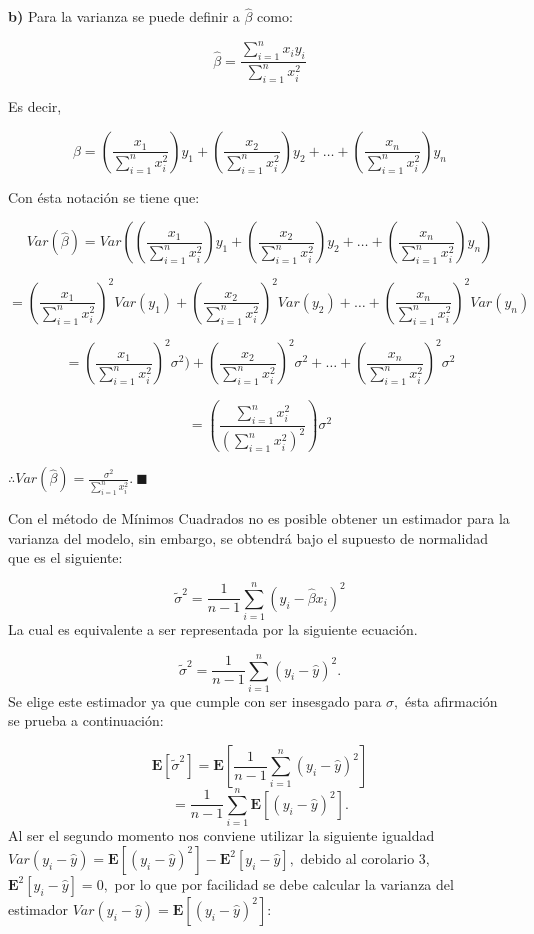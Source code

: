 \documentclass[
  a4paper,
  oneside,
  openany]{book}
\begin{document}
\textbf{b)} Para la varianza se puede definir a \(\hat{\beta}\) como:

\[\hat{\beta}=\frac{\sum_{i=1}^{n}x_{i}y_{i}}{\sum_{i=1}^{n}x_{i}^2}\]

Es decir,

\[\hat{\beta}=\left(\frac{x_{1}}{\sum_{i=1}^{n}x_{i}^2}\right)y_{1} + \left(\frac{x_{2}}{\sum_{i=1}^{n}x_{i}^2}\right)y_{2} + \ldots + \left(\frac{x_{n}}{\sum_{i=1}^{n}x_{i}^2}\right)y_{n}\]

Con ésta notación se tiene que:

\[Var\left(\hat{\beta}\right)=Var\left( \left(\frac{x_{1}}{\sum_{i=1}^{n}x_{i}^2}\right)y_{1} + \left(\frac{x_{2}}{\sum_{i=1}^{n}x_{i}^2}\right)y_{2} + \ldots + \left(\frac{x_{n}}{\sum_{i=1}^{n}x_{i}^2}\right)y_{n} \right)\]

\[=\left(\frac{x_{1}}{\sum_{i=1}^{n}x_{i}^2}\right)^2Var(y_{1}) + \left(\frac{x_{2}}{\sum_{i=1}^{n}x_{i}^2}\right)^2Var(y_{2}) + \ldots + \left(\frac{x_{n}}{\sum_{i=1}^{n}x_{i}^2}\right)^2Var(y_{n})\]

\[=\left(\frac{x_{1}}{\sum_{i=1}^{n}x_{i}^2}\right)^2\sigma^2) + \left(\frac{x_{2}}{\sum_{i=1}^{n}x_{i}^2}\right)^2\sigma^2 + \ldots + \left(\frac{x_{n}}{\sum_{i=1}^{n}x_{i}^2}\right)^2\sigma^2\]

\[=\left(\frac{\sum_{i=1}^{n}x_{i}^2}{(\sum_{i=1}^{n}x_{i}^2)^2}\right)\sigma^2\]

\(\therefore Var\left( \hat{\beta}\right)=\frac{\sigma^2}{\sum_{i=1}^{n}x_{i}^2}. \ \blacksquare\)

Con el método de Mínimos Cuadrados no es posible obtener un estimador para la varianza del modelo, sin embargo, se obtendrá bajo el supuesto de normalidad que es el siguiente:

\[\tilde{\sigma}^2=\frac{1}{n-1}\sum_{i=1}^{n}\left(y_{i}-\hat{\beta}x_{i}\right)^2\]
La cual es equivalente a ser representada por la siguiente ecuación.

\[\tilde{\sigma}^2=\frac{1}{n-1}\sum_{i=1}^{n}(y_{i}-\hat{y})^2.\]
Se elige este estimador ya que cumple con ser insesgado para \(\sigma,\) ésta afirmación se prueba a continuación:

\[\mathbf{E}[\tilde{\sigma}^2]=\mathbf{E}\left[\frac{1}{n-1}\sum_{i=1}^{n}(y_{i}-\hat{y})^2\right]\]
\[=\frac{1}{n-1}\sum_{i=1}^{n}\mathbf{E}\left[(y_{i}-\hat{y})^2\right].\]
Al ser el segundo momento nos conviene utilizar la siguiente igualdad \(Var(y_{i}-\hat{y})=\mathbf{E}[(y_{i}-\hat{y})^2]-\mathbf{E}^2[y_{i}-\hat{y}],\) debido al corolario 3, \(\mathbf{E}^2[y_{i}-\hat{y}]=0,\) por lo que por facilidad se debe calcular la varianza del estimador \(Var(y_{i}-\hat{y})=\mathbf{E}[(y_{i}-\hat{y})^2]:\)
\end{document}
